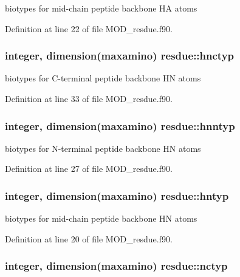 biotypes for mid-\/chain peptide backbone H\-A atoms 



Definition at line 22 of file M\-O\-D\-\_\-resdue.\-f90.

\hypertarget{classresdue_a35d2eabf774d188c40965ae2b6f74d82}{
\subsubsection[{hnctyp}]{\setlength{\rightskip}{0pt plus 5cm}integer, dimension(maxamino) resdue\-::hnctyp}}\label{classresdue_a35d2eabf774d188c40965ae2b6f74d82}


biotypes for C-\/terminal peptide backbone H\-N atoms 



Definition at line 33 of file M\-O\-D\-\_\-resdue.\-f90.

\hypertarget{classresdue_a186dccbe7c92c66436d7a74365ae8269}{
\subsubsection[{hnntyp}]{\setlength{\rightskip}{0pt plus 5cm}integer, dimension(maxamino) resdue\-::hnntyp}}\label{classresdue_a186dccbe7c92c66436d7a74365ae8269}


biotypes for N-\/terminal peptide backbone H\-N atoms 



Definition at line 27 of file M\-O\-D\-\_\-resdue.\-f90.

\hypertarget{classresdue_a91612d9e842c867e9eb542ca7934ed77}{
\subsubsection[{hntyp}]{\setlength{\rightskip}{0pt plus 5cm}integer, dimension(maxamino) resdue\-::hntyp}}\label{classresdue_a91612d9e842c867e9eb542ca7934ed77}


biotypes for mid-\/chain peptide backbone H\-N atoms 



Definition at line 20 of file M\-O\-D\-\_\-resdue.\-f90.

\hypertarget{classresdue_a70d0e2e9c1996d537b7753aec59e0c8d}{
\subsubsection[{nctyp}]{\setlength{\rightskip}{0pt plus 5cm}integer, dimension(maxamino) resdue\-::nctyp}}\label{classresdue_a70d0e2e9c1996d537b7753aec59e0c8d}


